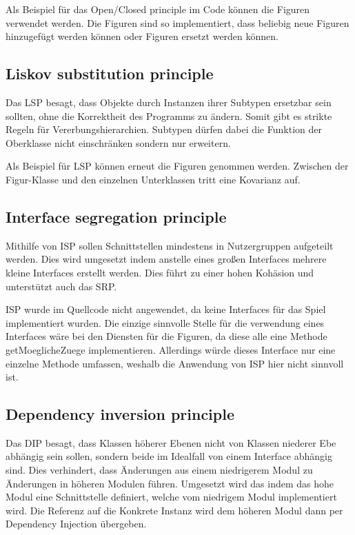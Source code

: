 Als Beispiel für das Open/Closed principle im Code können die Figuren verwendet werden. Die Figuren sind so implementiert, dass beliebig neue Figuren hinzugefügt werden können oder Figuren ersetzt werden können.
\subsection{Liskov substitution principle}
Das LSP besagt, dass Objekte durch Instanzen ihrer Subtypen ersetzbar sein sollten, ohne die Korrektheit des Programms zu ändern. Somit gibt es strikte Regeln für Vererbungshierarchien. Subtypen dürfen dabei die Funktion der Oberklasse nicht einschränken sondern nur erweitern.

Als Beispiel für LSP können erneut die Figuren genommen werden. Zwischen der Figur-Klasse und den einzelnen Unterklassen tritt eine Kovarianz auf.


\subsection{Interface segregation principle}
Mithilfe von ISP sollen Schnittstellen mindestens in Nutzergruppen aufgeteilt werden. Dies wird umgesetzt indem anstelle eines großen Interfaces mehrere kleine Interfaces erstellt werden. Dies führt zu einer hohen Kohäsion und unterstützt auch das SRP. 

ISP wurde im Quellcode nicht angewendet, da keine Interfaces für das Spiel implementiert wurden. Die einzige sinnvolle Stelle für die verwendung eines Interfaces wäre bei den Diensten für die Figuren, da diese alle eine Methode getMoeglicheZuege implementieren. Allerdings würde dieses Interface nur eine einzelne Methode umfassen, weshalb die Anwendung von ISP hier nicht sinnvoll ist.

\subsection{Dependency inversion principle}
Das DIP besagt, dass Klassen höherer Ebenen nicht von Klassen niederer Ebe abhängig sein sollen, sondern beide im Idealfall von einem Interface abhängig sind. Dies verhindert, dass Änderungen aus einem niedrigerem Modul zu Änderungen in höheren Modulen führen. Umgesetzt wird das indem das hohe Modul eine Schnittstelle definiert, welche vom niedrigem Modul implementiert wird. Die Referenz auf die Konkrete Instanz wird dem höheren Modul dann per Dependency Injection übergeben. 

